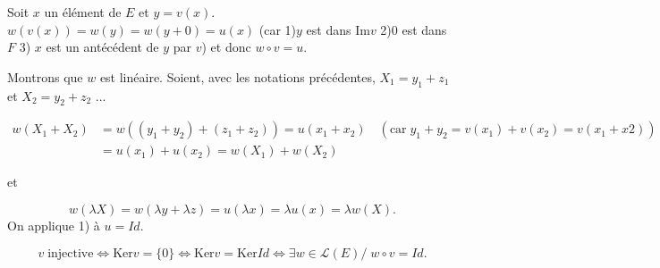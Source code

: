{\begin{enumerate}
{Soit $x$ un élément de $E$ et $y=v(x)$. $w(v(x))=w(y)=w(y+0)=u(x)$ (car 1)$y$ est dans $\mbox{Im}v$ 2)$0$ est dans $F$
3) $x$ est un antécédent de $y$ par $v$) et donc $w\circ v=u$.

Montrons que $w$ est linéaire. Soient, avec les notations précédentes, $X_1=y_1+z_1$ et $X_2=y_2+z_2$ ...

\begin{align*}
w(X_1+X_2)&=w((y_1+y_2)+(z_1+z_2))=u(x_1+x_2)\quad(\mbox{car}\;y_1+y_2=v(x_1)+v(x_2)=v(x_1+x2))\\
 &=u(x_1)+u(x_2)=w(X_1)+w(X_2)
\end{align*}

et

$$w(\lambda X)=w(\lambda y+\lambda z)=u(\lambda x)=\lambda u(x)=\lambda w(X).$$
On applique 1) à $u=Id$.

$$v\;\mbox{injective}\Leftrightarrow\mbox{Ker}v=\{0\}\Leftrightarrow\mbox{Ker}v=\mbox{Ker}Id\Leftrightarrow\exists w\in\mathcal{L}(E)/\;w\circ v=Id.$$
}
\end{enumerate}
}
